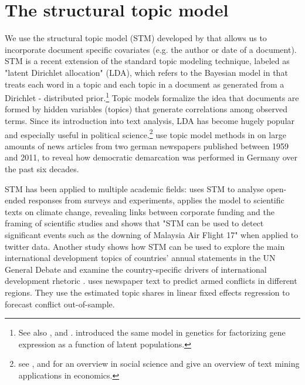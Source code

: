 \documentclass[12pt,a4paper,notitlepage]{article}
\begin{document}
\section{The structural topic model}\label{ch_model}

We use the structural topic model (STM) developed by \citet{roberts_model_2016} that allows us to incorporate document specific covariates (e.g. the author or date of a document). STM is a recent extension of the standard topic modeling technique, labeled as "latent Dirichlet allocation" (LDA), which refers to the Bayesian model in \citet{blei_latent_2003} that treats each word in a topic and each topic in a document as generated from a Dirichlet - distributed prior.\footnote{See also \citet{griffiths_probabilistic_2002}, \citet{griffiths_finding_2004} and \citet{hofmann_probabilistic_1999}. \citet{pritchard_inference_2000} introduced the same model in genetics for factorizing gene expression as a function of latent populations.} Topic models formalize the idea that documents are formed by hidden variables (topics) that generate correlations among observed terms. Since its introduction into text analysis, LDA has become hugely popular and especially useful in political science.\footnote{see \citet{blei_probabilistic_2012}, \citet{grimmer_text_2013} and \citet{wiedmann_text_2016} for an overview in social science and \citet{gentzkow_text_2017} give an overview of text mining applications in economics.} \citet{wiedmann_text_2016} use topic model methods in on large amounts of news articles from two german newspapers published between 1959 and 2011, to reveal how democratic demarcation was performed in Germany over the past six decades. 

STM has been applied to multiple academic fields: \citet{roberts_structural_2014} uses STM to analyse open-ended responses from surveys and experiments, \citet{farrell_corporate_2016} applies the model to scientific texts on climate change, revealing links between corporate funding and the framing of scientific studies and \citet{mishler_using_2015} shows that "STM can be used to detect significant events such as the downing of Malaysia Air Flight 17" when applied to twitter data. Another study shows how STM can be used to explore the main international development topics of countries’ annual statements in the UN General Debate and examine the country-specific drivers of international development rhetoric \citep{baturo_what_2017}. \citet{mueller_reading_2016} uses newspaper text to predict armed conflicts in different regions. They use the estimated topic shares in linear fixed effects regression to forecast conflict out-of-sample.
\end{document}

